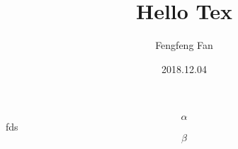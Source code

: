 \documentclass[12pt,a4paper]{article}
\title{Hello Tex}
\author{Fengfeng Fan}
\date{2018.12.04}
\begin{document}
	\maketitle
	\begin{equation}
		\alpha
	\end{equation}
	fds
	\begin{equation}
		\beta
	\end{equation}
\end{document}
